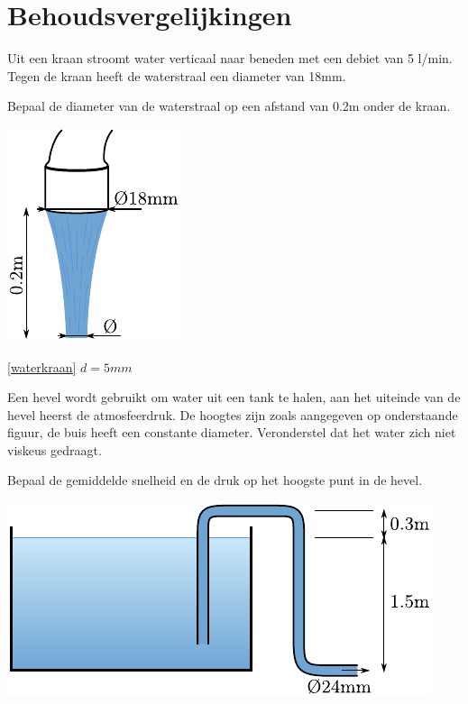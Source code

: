 \chapter{Behoudsvergelijkingen}
\label{sec:Behoudsvergelijkingen}
\begin{toepassing}[*]
	\label{waterkraan}
Uit een kraan stroomt water verticaal naar beneden met een debiet van 5 l/min. Tegen de kraan heeft de waterstraal een diameter van 18mm. 

Bepaal de diameter van de waterstraal op een afstand van 0.2m onder de kraan.

	\centering
	\includegraphics{fig/behoudsvergelijkingen/waterkraan}

\end{toepassing}
\begin{antwoord}{\ref{waterkraan}}
	$d = 5\unit{mm}$
\end{antwoord}
\begin{toepassing}[*]
	\label{hevel}
Een hevel wordt gebruikt om water uit een tank te halen, aan het uiteinde van de hevel heerst de atmosfeerdruk. De hoogtes zijn zoals aangegeven op onderstaande figuur, de buis heeft een constante diameter. Veronderstel dat het water zich niet viskeus gedraagt.
		
Bepaal de gemiddelde snelheid en de druk op het hoogste punt in de hevel.

	\centering
	\includegraphics{fig/behoudsvergelijkingen/hevel}

\end{toepassing}
